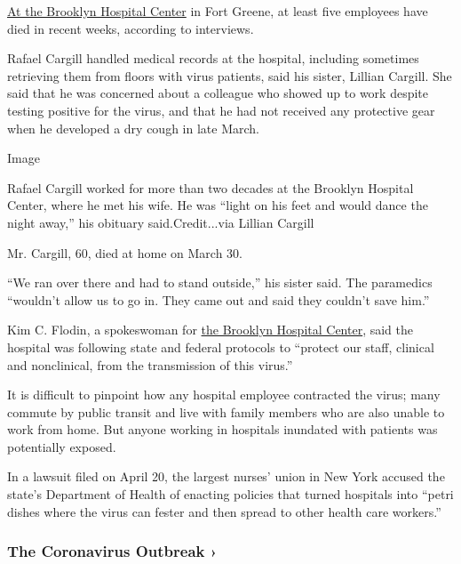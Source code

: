 \href{https://www.nytimes.com/2020/03/26/nyregion/coronavirus-brooklyn-hospital.html}{At
the Brooklyn Hospital Center} in Fort Greene, at least five employees
have died in recent weeks, according to interviews.

Rafael Cargill handled medical records at the hospital, including
sometimes retrieving them from floors with virus patients, said his
sister, Lillian Cargill. She said that he was concerned about a
colleague who showed up to work despite testing positive for the virus,
and that he had not received any protective gear when he developed a dry
cough in late March.

Image

Rafael Cargill worked for more than two decades at the Brooklyn Hospital
Center, where he met his wife. He was ``light on his feet and would
dance the night away,'' his obituary said.Credit...via Lillian Cargill

Mr. Cargill, 60, died at home on March 30.

``We ran over there and had to stand outside,'' his sister said. The
paramedics ``wouldn't allow us to go in. They came out and said they
couldn't save him.''

Kim C. Flodin, a spokeswoman for
\href{https://www.nytimes.com/2020/04/12/nyregion/coronavirus-births-mothers.html}{the
Brooklyn Hospital Center}, said the hospital was following state and
federal protocols to ``protect our staff, clinical and nonclinical, from
the transmission of this virus.''

It is difficult to pinpoint how any hospital employee contracted the
virus; many commute by public transit and live with family members who
are also unable to work from home. But anyone working in hospitals
inundated with patients was potentially exposed.

In a lawsuit filed on April 20, the largest nurses' union in New York
accused the state's Department of Health of enacting policies that
turned hospitals into ``petri dishes where the virus can fester and then
spread to other health care workers.''

\href{https://www.nytimes.com/news-event/coronavirus?action=click\&pgtype=Article\&state=default\&region=MAIN_CONTENT_3\&context=storylines_faq}{}

\hypertarget{the-coronavirus-outbreak-}{%
\subsubsection{The Coronavirus Outbreak
›}\label{the-coronavirus-outbreak-}}

